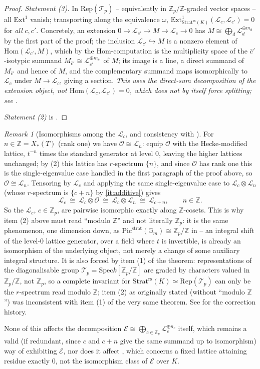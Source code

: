 \documentclass[11pt,reqno]{amsart}
\newcommand{\Zp}{\mathbb{Z}_p}
\newcommand{\ZZ}{\mathbb{Z}}
\newcommand{\GG}{\mathbb{G}}
\newcommand{\cO}{\mathcal{O}}
\newcommand{\cE}{\mathcal{E}}
\newcommand{\cL}{\mathcal{L}}
\newcommand{\cT}{\mathcal{T}}
\newcommand{\Strat}{\mathrm{Strat}}
\newcommand{\rs}{\mathrm{rs}}
\newcommand{\strat}{\mathrm{strat}}
\newcommand{\Pic}{\mathrm{Pic}}
\newcommand{\Rep}{\mathrm{Rep}}
\newcommand{\Hom}{\mathrm{Hom}}
\newcommand{\Ext}{\mathrm{Ext}}
\newcommand{\Spec}{\mathrm{Spec}}
\newcommand{\Xst}{X_*(T)}
\theoremstyle{plain}
\theoremstyle{definition}
\theoremstyle{remark}
\newtheorem{remark}[theorem]{Remark}
\numberwithin{equation}{section}
\begin{document}
\begin{proof}
\emph{Statement (3).}  In $\Rep(\cT_p)$ -- equivalently in
$\Zp/\ZZ$-graded vector spaces -- all $\Ext^1$ vanish; transporting along
the equivalence $\omega$, $\Ext^1_{\Strat^{\rs}(K)}(\cL_c,\cL_{c'})=0$ for
\emph{all} $c,c'$.  Concretely, an extension $0\to\cL_{c'}\to M\to\cL_c\to0$
has $M\cong\bigoplus_d\cL_d^{\oplus m_d}$ by the first part of the proof;
the inclusion $\cL_{c'}\hookrightarrow M$ is a nonzero element of
$\Hom(\cL_{c'},M)$, which by the $\Hom$-computation is the multiplicity
space of the $\bar c'$-isotypic summand $M_{\bar c'}\cong\cL_{c'}^{\oplus m_{\bar c'}}$
of $M$; its image is a line, a direct summand of $M_{\bar c'}$ and hence
of $M$, and the complementary summand maps isomorphically to $\cL_c$
under $M\to\cL_c$, giving a section.  \emph{This uses the direct-sum
decomposition of the extension object, not $\Hom(\cL_c,\cL_{c'})=0$, which
does not by itself force splitting; see .}

\emph{Statement (2)} is .
\end{proof}

\begin{remark}[Isomorphisms among the $\cL_c$, and consistency with
]\label{rem:completemodZ}
For $n\in\ZZ=\Xst$ (rank one) we have $\cO\cong\cL_n$: equip $\cO$ with the
Hecke-modified lattice, $t^{-n}$ times the standard generator at level
$0$, leaving the higher lattices unchanged; by (2) this
lattice has $r$-spectrum $\{n\}$, and since $\cO$ has rank one this is the
single-eigenvalue case handled in the first paragraph of the proof above,
so $\cO\cong\cL_n$.  Tensoring by $\cL_c$ and applying the same
single-eigenvalue case to $\cL_c\otimes\cL_n$ (whose $r$-spectrum is
$\{c+n\}$ by \eqref{it:additive}) gives
\[
   \cL_c\ \cong\ \cL_c\otimes\cO\ \cong\ \cL_c\otimes\cL_n\ \cong\ \cL_{c+n},
   \qquad n\in\ZZ .
\]
So the $\cL_c$, $c\in\Zp$, are pairwise isomorphic exactly along
$\ZZ$-cosets.  This is why item (2) above must read ``modulo $\ZZ$'' and
not literally $\Zp$: it is the same phenomenon, one dimension down, as
$\Pic^{\strat}(\GG_m)\cong\Zp/\ZZ$ in  -- an integral shift
of the level-$0$ lattice generator, over a field where $t$ is invertible,
is already an isomorphism of the underlying object, not merely a change
of some auxiliary integral structure.  It is also forced by item (1) of
the theorem: representations of the diagonalisable group
$\cT_p=\Spec k[\Zp/\ZZ]$ are graded by characters valued in $\Zp/\ZZ$, not
$\Zp$, so a complete invariant for $\Strat^{\rs}(K)\simeq\Rep(\cT_p)$ can
only be the $r$-spectrum read modulo $\ZZ$; item (2) as originally stated
(without ``modulo $\ZZ$'') was inconsistent with item (1) of the very same
theorem.  See  for the correction history.

None of this affects the decomposition
$\cE\cong\bigoplus_{c\in\Zp}\cL_c^{\oplus n_c}$ itself, which remains a
valid (if redundant, since $c$ and $c+n$ give the same summand up to
isomorphism) way of exhibiting $\cE$, nor does it affect
, which concerns a fixed lattice attaining residue
exactly $0$, not the isomorphism class of $\cE$ over $K$.
\end{remark}
\end{document}
